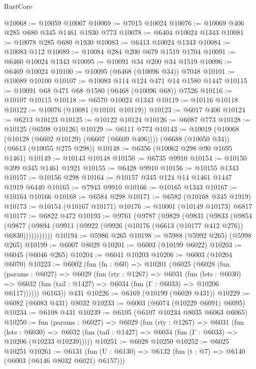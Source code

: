 \begin{lexlean}{RustCore}
\begin{coremodule}
{\begin{coremodule}
{{{{{{{{{{{{{{{{{{{{{{{{{{{{{{{{{{{{{{{{{{{{{{{@10068 := @10059 @10067
@10069 := @7015 @10024
@10076 := @10069 @406 @285 @680 @345 @1461 @1930 @773
@10078 := @6404 @10024 @1343
@10081 := @10078 @285 @680 @1930
@10083 := @6413 @10024 @1343
@10084 := @10083 @112
@10089 := @10084 @284 @200 @679 @1519 @1704
@10091 := @6460 @10024 @1343
@10095 := @10091 @34 @200 @34 @1519
@10096 := @6469 @10024
@10100 := @10095 (@6468 (@10096 @34)) @7048
@10101 := @10089 @10100
@10107 := @10083 @114 @124 @471 @14 @1580 @1447
@10115 := @10091 @68 @471 @68 @1580 (@6468 (@10096 @68)) @7526
@10116 := @10107 @10115
@10118 := @6570 @10024 @1343
@10119 := @10116 @10118
@10122 := @10076 (@10081 (@10101 @10119))
@10123 := @6017 @406
@10124 := @6213 @10123
@10125 := @10122 @10124
@10126 := @6087 @773
@10128 := @10125 (@6598 @10126)
@10129 := @6111 @773
@10143 := @10019
    (@10068 (@10128 (@6602 @10129) (@6607 (@6609 @406))))
    (@6688 (@10050 @34))
    (@6613 (@10055 @275 @298))
@10148 := @6356 (@10062 @298 @90 @1695 @1461)
@10149 := @10143 @10148
@10150 := @6735 @9910
@10154 := @10150 @399 @345 @1461 @1921
@10155 := @6428 @9910
@10156 := @10155 @1343
@10157 := @10156 @298
@10164 := @10157 @345 @124 @14 @1461 @1447 @1919 @6440
@10165 := @7943 @9910
@10166 := @10165 @1343
@10167 := @10164 @10166
@10168 := @6584 @298
@10171 := @6582 (@10168 @345 @1919)
@10173 := @10154 (@10167 @10171)
@10176 := @10001 (@10149 @10173) @6817
@10177 := @6822 @472
@10193 := @9761
    (@9787
      (@9829
        (@9831
          (@9833
            (@9854
              (@9877 (@9894 (@9911 (@9922 (@9926 (@10176 (@6613 (@10177 @412 @276)) @6830)))))))))))
@10194 := @5986 @265
@10198 := @5988 (@5992 @265) (@5998 @265)
@10199 := @6007 @8029
@10201 := @6003 (@10199 @6022)
@10203 := @6045 (@6046 @265)
@10204 := @6041 @10203
@10206 := @6003 (@10204 @6070)
@10223 := @6002
    (fun (fn : @60) =>
    @10201
      (@6025
        (@6028
          (fun (params : @6027) =>
          @6029
            (fun (rty : @1267) =>
            @6031
              (fun (lets : @6030) =>
              @6032 (fun (tail : @1427) => @6034 (fun (Γ : @6033) => @10206 @6117))))))
        @6163))
    @431
@10226 := @6169 (@10199 (@6020 @431))
@10229 := @6082 (@6083 @431) @8032
@10233 := @6003 (@6074 (@10229 @6091) @6095)
@10234 := @6108 @431
@10239 := @6105 (@6107 @10234 @8035 @6063 @6065)
@10250 := fun (params : @6027) =>
  @6029
    (fun (rty : @1267) =>
    @6031
      (fun (lets : @6030) =>
      @6032 (fun (tail : @1427) => @6034 (fun (Γ : @6033) => @10206 (@10233 @10239)))))
@10251 := @6028 @10250
@10252 := @6025 @10251
@10261 := @6131 (fun (U : @6130) => @6132 (fun (t : @7) => @6140 (@6003 (@6146 @8032 @6021) @6157)))
}}}}}}}}}}}}}}}}}}}}}}}}}}}}}}}}}}}}}}}}}}}}}}}
\end{coremodule}}
\end{coremodule}
\end{lexlean}
